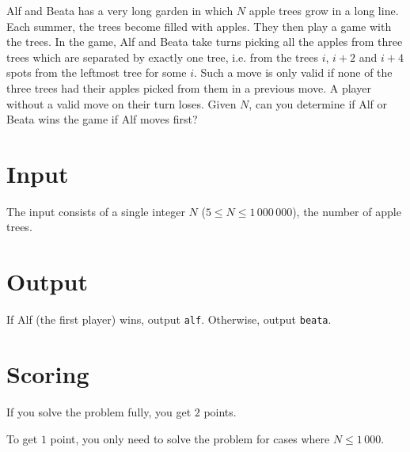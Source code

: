 Alf and Beata has a very long garden in which $N$ apple trees grow in a long line.
Each summer, the trees become filled with apples.
They then play a game with the trees.
In the game, Alf and Beata take turns picking all the apples from three trees which are separated by exactly one tree, i.e. from the trees $i$, $i + 2$ and $i + 4$ spots from the leftmost tree for some $i$.
Such a move is only valid if none of the three trees had their apples picked from them in a previous move.
A player without a valid move on their turn loses.
Given $N$, can you determine if Alf or Beata wins the game if Alf moves first?

\section*{Input}
The input consists of a single integer $N$ ($5 \le N \le 1\,000\,000$), the number of apple trees.

\section*{Output}
If Alf (the first player) wins, output \texttt{alf}.
Otherwise, output \texttt{beata}.

\section*{Scoring}
If you solve the problem fully, you get $2$ points.

To get $1$ point, you only need to solve the problem for cases where $N \le 1\,000$.

